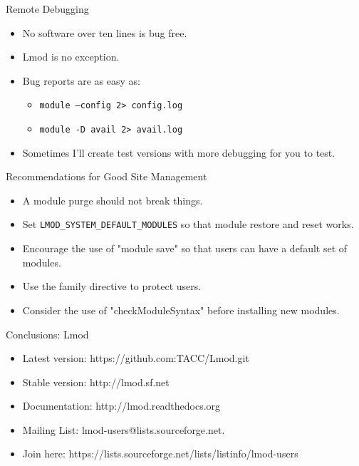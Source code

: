 \documentclass[dvipsnames,aspectratio=169]{beamer}
\begin{document}
\begin{frame}{Remote Debugging}
  \begin{itemize}
    \item No software over ten lines is bug free.
    \item Lmod is no exception.
    \item Bug reports are as easy as:
      \begin{itemize}
        \item \texttt{module --config  2> config.log}
        \item \texttt{module -D avail  2> avail.log}
      \end{itemize}
    \item Sometimes I'll create test versions with more debugging for
      you to test.
  \end{itemize}
\end{frame}

\begin{frame}{Recommendations for Good Site Management}
  \begin{itemize}
    \item A module purge should not break things.
    \item Set \texttt{LMOD\_SYSTEM\_DEFAULT\_MODULES} so that module
      restore and reset works.
    \item Encourage the use of "module save" so that users can have a
      default set of modules.
    \item Use the family directive to protect users.
    \item Consider the use of "checkModuleSyntax" before installing new modules.
  \end{itemize}
\end{frame}

\begin{frame}{Conclusions: Lmod}
  \begin{itemize}
    \item Latest version: https://github.com:TACC/Lmod.git
    \item Stable version: http://lmod.sf.net
    \item Documentation:  http://lmod.readthedocs.org
    \item Mailing List:   lmod-users@lists.sourceforge.net.
    \item Join here: https://lists.sourceforge.net/lists/listinfo/lmod-users
  \end{itemize}
\end{frame}


%
\end{document}
